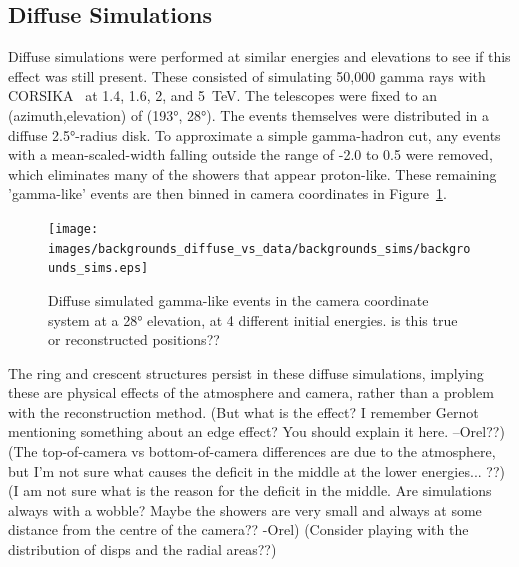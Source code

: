   \FloatBarrier

  \subsection{Diffuse Simulations}\label{subsubsec:diffusesims}
    Diffuse simulations were performed at similar energies and elevations to see if this effect was still present.
    These consisted of simulating 50,000 gamma rays with CORSIKA~\cite{corsika1998} at 1.4, 1.6, 2, and \SI{5}{\TeV}.
    The telescopes were fixed to an (azimuth,elevation) of (\ang{193}, \ang{28}).
    The events themselves were distributed in a diffuse \ang{2.5}-radius disk.
    To approximate a simple gamma-hadron cut, any events with a mean-scaled-width falling outside the range of -2.0 to 0.5 were removed, which eliminates many of the showers that appear proton-like.
    These remaining 'gamma-like' events are then binned in camera coordinates in Figure~\ref{fig:back_simdiffuse}.

    \begin{figure}[ht]
      \centering
      \texttt{[image: images/backgrounds\_diffuse\_vs\_data/backgrounds\_sims/backgrounds\_sims.eps]}
      \caption[Diffuse Simulated Backgrounds]{
        Diffuse simulated gamma-like events in the camera coordinate system at a \ang{28} elevation, at 4 different initial energies.
        {\color{red}is this true or reconstructed positions??}
      }
      \label{fig:back_simdiffuse}
    \end{figure}

    The ring and crescent structures persist in these diffuse simulations, implying these are physical effects of the atmosphere and camera, rather than a problem with the reconstruction method.
    {\color{red}(But what is the effect? I remember Gernot mentioning something about an edge effect? You should explain it here. --Orel??)}
    {\color{red}(The top-of-camera vs bottom-of-camera differences are due to the atmosphere, but I'm not sure what causes the deficit in the middle at the lower energies... ??)}
    {\color{red}(I am not sure what is the reason for the deficit in the middle. Are simulations always with a wobble? Maybe the showers are very small and always at some distance from the centre of the camera?? -Orel)}
    {\color{red}(Consider playing with the distribution of disps and the radial areas??)}

